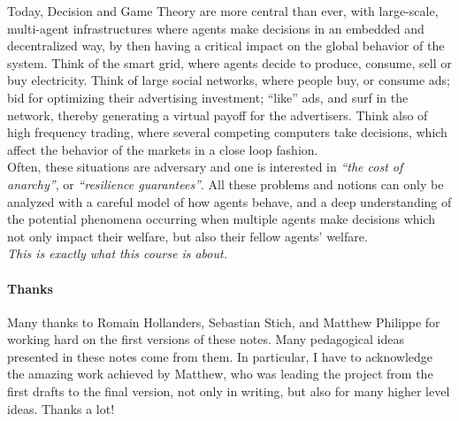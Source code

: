 Today, Decision and Game Theory are more central than ever, with large-scale, multi-agent infrastructures where agents make decisions in an embedded and decentralized way, by then having a critical impact on the global behavior of the system.  Think of the smart grid, where agents decide to produce, consume, sell or buy electricity.  Think of large social networks, where people buy, or consume ads; bid for optimizing their advertising investment; ``like'' ads, and surf in the network, thereby generating a virtual payoff for the advertisers.  Think also of high frequency trading, where several competing computers take decisions, which affect the behavior of the markets in a close loop fashion.\\   Often, these situations are adversary and one is interested in \emph{``the cost of anarchy''}, or \emph{``resilience guarantees''}.  All these problems and notions can only be analyzed with a careful model of how agents behave, and a deep understanding of the potential phenomena occurring when multiple agents make decisions which not only impact their welfare, but also their fellow agents' welfare.  \\
\emph{This is exactly what this course is about.}


\paragraph{Thanks}
Many thanks to Romain Hollanders, Sebastian Stich, and Matthew Philippe for working hard on the first versions of these notes. Many pedagogical ideas presented in these notes come from them.  In particular, I have to acknowledge the amazing work achieved by Matthew, who was leading the project from the first drafts to the final version, not only in writing, but also for many higher level ideas.  Thanks a lot!

\label{chap:intro}




\ifx \globalmark \undefined %


	
\else

\fi




